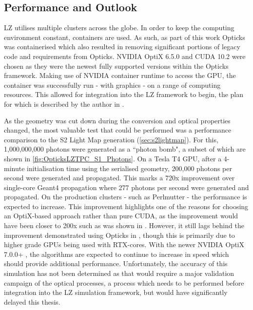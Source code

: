 \subsection{Performance and Outlook}
\par
LZ utilises multiple clusters across the globe.
In order to keep the computing environment constant, containers are used.
As such, as part of this work Opticks was containerised \cite{opticks_docker_ref} which also resulted in removing significant portions of legacy code and requirements from Opticks.
NVIDIA OptiX 6.5.0 and CUDA 10.2 were chosen as they were the newest fully supported versions within the Opticks framework.
Making use of NVIDIA container runtime to access the GPU, the container was successfully run - with graphics - on a range of computing resources.
This allowed for integration into the LZ framework to begin, the plan for which is described by the author in \cite{SEriksen_Opticks_CHEP_2021_ref,lz_status_with_opticks_ref}.
\par
As the geometry was cut down during the conversion and optical properties changed, the most valuable test that could be performed was a performance comparison to the S2 Light Map generation (\autoref{sec:s2lightmap}).
For this, 1,000,000,000 photons were generated as a ``photon bomb", a subset of which are shown in \autoref{fig:OpticksLZTPC_S1_Photons}.
On a Tesla T4 GPU, after a 4-minute initialisation time using the serialised geometry, 200,000 photons per second were generated and propagated.
This marks a 720x improvement over single-core Geant4 propagation where 277 photons per second were generated and propagated.
On the production clusters - such as Perlmutter - the performance is expected to increase.
This improvement highlights one of the reasons for choosing an OptiX-based approach rather than pure CUDA, as the improvement would have been closer to 200x such as was shown in \cite{chroma_presentation_ref}.
However, it still lags behind the improvement demonstrated using Opticks in \cite{Opticks_CHEP_2019_ref}, though this is primarily due to higher grade GPUs being used with RTX-cores.
With the newer NVIDIA OptiX 7.0.0+ \cite{NVidiaOptiX_7_ref}, the algorithms are expected to continue to increase in speed which should provide additional performance.
Unfortunately, the accuracy of this simulation has not been determined as that would require a major validation campaign of the optical processes, a process which needs to be performed before integration into the LZ simulation framework, but would have significantly delayed this thesis.


